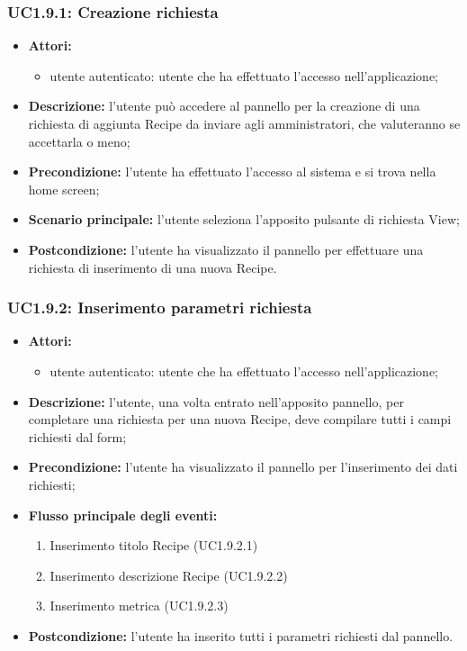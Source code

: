\subsubsection{UC1.9.1: Creazione richiesta}
\begin{itemize}
	\item \textbf{Attori:}
	\begin{itemize}
		\item utente autenticato: utente che ha effettuato l'accesso nell'applicazione;
	\end{itemize}
	\item \textbf{Descrizione:} l'utente può accedere al pannello per la creazione di una richiesta di aggiunta Recipe da inviare agli amministratori, che valuteranno se accettarla o meno;
	\item \textbf{Precondizione:} l'utente ha effettuato l'accesso al sistema e si trova nella home screen;
	\item \textbf{Scenario principale:} l'utente seleziona l'apposito pulsante di richiesta View;
	\item \textbf{Postcondizione:} l'utente ha visualizzato il pannello per effettuare una richiesta di inserimento di una nuova Recipe.
\end{itemize}

\subsubsection{UC1.9.2: Inserimento parametri richiesta}
\begin{itemize}
	\item \textbf{Attori:}
	\begin{itemize}
		\item utente autenticato: utente che ha effettuato l'accesso nell'applicazione;
	\end{itemize}
	\item \textbf{Descrizione:} l'utente, una volta entrato nell'apposito pannello, per completare una richiesta per una nuova Recipe, deve compilare tutti i campi richiesti dal form;
	\item \textbf{Precondizione:} l'utente ha visualizzato il pannello per l'inserimento dei dati richiesti;
	\item \textbf{Flusso principale degli eventi:}
	\begin{enumerate}
		\item Inserimento titolo Recipe (UC1.9.2.1)
		\item Inserimento descrizione Recipe (UC1.9.2.2)
		\item Inserimento metrica (UC1.9.2.3)
	\end{enumerate}
	\item \textbf{Postcondizione:} l'utente ha inserito tutti i parametri richiesti dal pannello.
\end{itemize}

